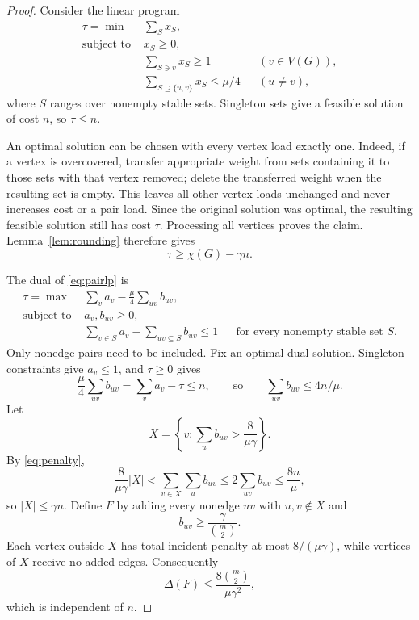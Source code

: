 \documentclass[11pt]{article}
\begin{document}
\begin{proof}
Consider the linear program \begin{equation}\label{eq:pairlp}
\begin{aligned}
\tau=\min\;&\sum_S x_S,\\
\text{subject to }&x_S\ge0,\\
&\sum_{S\ni v}x_S\ge1 &&(v\in V(G)),\\
&\sum_{S\supseteq\{u,v\}}x_S\le\mu/4 &&(u\ne v),
\end{aligned}
\end{equation} where \(S\) ranges over nonempty stable sets. Singleton sets give a
 feasible solution of cost \(n\), so \(\tau\le n\).

An optimal solution can be chosen with every vertex load exactly one. Indeed, if a
 vertex is overcovered, transfer appropriate weight from sets containing it to those
 sets with that vertex removed; delete the transferred weight when the resulting set is
 empty. This leaves all other vertex loads unchanged and never increases cost or a pair
 load. Since the original solution was optimal, the resulting feasible solution still
 has cost \(\tau\). Processing all vertices proves the claim. Lemma~\ref{lem:rounding}
 therefore gives \[
\tau\ge\chi(G)-\gamma n.
\]

The dual of \eqref{eq:pairlp} is \begin{equation}\label{eq:pairdual}
\begin{aligned}
\tau=\max\;&\sum_v a_v-\frac{\mu}{4}\sum_{uv}b_{uv},\\
\text{subject to }&a_v,b_{uv}\ge0,\\
&\sum_{v\in S}a_v-\sum_{uv\subseteq S}b_{uv}\le1
&&\text{for every nonempty stable set }S.
\end{aligned}
\end{equation} Only nonedge pairs need to be included. Fix an optimal dual solution.
 Singleton constraints give \(a_v\le1\), and \(\tau\ge0\) gives
 \begin{equation}\label{eq:penalty}
\frac{\mu}{4}\sum_{uv}b_{uv}
 =\sum_v a_v-\tau\le n,
 \qquad\text{so}\qquad
\sum_{uv}b_{uv}\le4n/\mu.
\end{equation} Let \[
X=\left\{v:\sum_u b_{uv}>\frac8{\mu\gamma}\right\}.
\] By \eqref{eq:penalty},
\[
 \frac8{\mu\gamma}|X|
 <\sum_{v\in X}\sum_u b_{uv}
 \le2\sum_{uv}b_{uv}\le\frac{8n}{\mu},
\]
so \(|X|\le\gamma n\). Define \(F\) by adding every nonedge \(uv\)
 with \(u,v\notin X\) and \[
b_{uv}\ge\frac{\gamma}{\binom m2}.
\] Each vertex outside \(X\) has total incident penalty at most \(8/(\mu\gamma)\), while vertices of
 \(X\) receive no added edges. Consequently \[
\Delta(F)\le\frac{8\binom m2}{\mu\gamma^2},
\]
which is independent of \(n\).


\end{proof}
\end{document}
